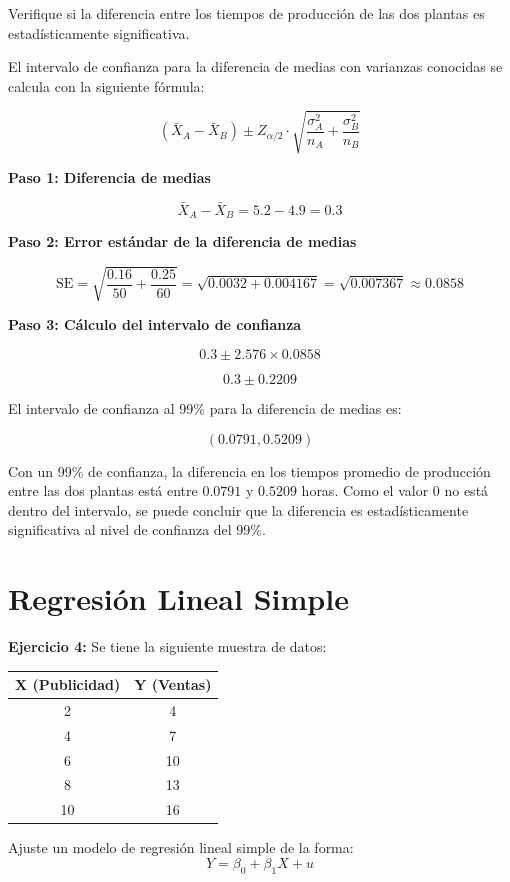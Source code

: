 \documentclass[10pt,a4paper]{article}
\begin{document}
 Verifique si la diferencia entre los tiempos de producción de las dos plantas es estadísticamente significativa.

 {\color{red}
 El intervalo de confianza para la diferencia de medias con varianzas conocidas se calcula con la siguiente fórmula:

 \[
 (\bar{X}_A - \bar{X}_B) \pm Z_{\alpha/2} \cdot \sqrt{\frac{\sigma_A^2}{n_A} + \frac{\sigma_B^2}{n_B}}
\]

{\bf Paso 1: Diferencia de medias}

 \[
 \bar{X}_A - \bar{X}_B = 5.2 - 4.9 = 0.3
 \]

{\bf Paso 2: Error estándar de la diferencia de medias}

 \[
 \text{SE} = \sqrt{\frac{0.16}{50} + \frac{0.25}{60}} = \sqrt{0.0032 + 0.004167} = \sqrt{0.007367} \approx 0.0858
 \]

{\bf Paso 3: Cálculo del intervalo de confianza}

\[
 0.3 \pm 2.576 \times 0.0858
 \]

 \[
 0.3 \pm 0.2209
 \]


 El intervalo de confianza al 99\% para la diferencia de medias es:

\[
(0.0791, 0.5209)
\]


Con un 99\% de confianza, la diferencia en los tiempos promedio de producción entre las dos plantas está entre \(0.0791\) y \(0.5209\) horas. Como el valor 0 no está dentro del intervalo, se puede concluir que la diferencia es estadísticamente significativa al nivel de confianza del 99\%.
}


\section{Regresión Lineal Simple}

\textbf{Ejercicio 4:} Se tiene la siguiente muestra de datos:
\begin{center}
\begin{tabular}{|c|c|}
\hline
X (Publicidad) & Y (Ventas) \\
\hline
2 & 4 \\
\hline
4 & 7 \\
\hline
6 & 10 \\
\hline
8 & 13 \\
\hline
10 & 16 \\
\hline
\end{tabular}
\end{center}

Ajuste un modelo de regresión lineal simple de la forma:
$$Y = \beta_0 + \beta_1 X + u $$
\end{document}

